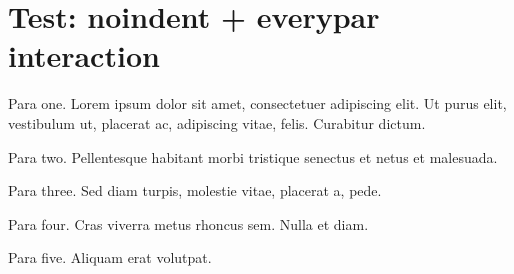 \documentclass[11pt,a4paper]{article}
\begin{document}
\section{Test: noindent + everypar interaction}

\noindent
{}%
%
%

Para one. Lorem ipsum dolor sit amet, consectetuer adipiscing elit. Ut purus elit, vestibulum ut, placerat ac, adipiscing vitae, felis. Curabitur dictum.

Para two. Pellentesque habitant morbi tristique senectus et netus et malesuada.

Para three. Sed diam turpis, molestie vitae, placerat a, pede.

Para four. Cras viverra metus rhoncus sem. Nulla et diam.

Para five. Aliquam erat volutpat.

\everypar{}%
\end{document}
